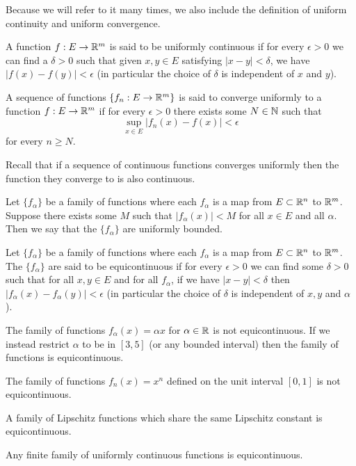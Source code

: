 Because we will refer to it many times, we also include the definition of uniform continuity and uniform convergence.
\begin{definition}
A function $f: E \to \mathbb{R}^m$ is said to be uniformly continuous if for every $\epsilon > 0$ we can find a $\delta > 0$ such that given $x, y \in E$ satisfying $|x - y| < \delta$, we have $|f(x) - f(y)| < \epsilon$ (in particular the choice of $\delta$ is independent of $x$ and $y$).
\end{definition}
\begin{definition}
A sequence of functions $\{f_n: E \to \mathbb{R}^m\}$ is said to converge uniformly to a function $f: E \to \mathbb{R}^m$ if for every $\epsilon > 0$ there exists some $N \in \mathbb{N}$ such that
$$ \sup_{x \in E} |f_n(x) - f(x)| < \epsilon $$
for every $n \geq N$.
\end{definition}
Recall that if a sequence of continuous functions converges uniformly then the function they converge to is also continuous.

\begin{definition}
Let $\{f_\alpha\}$ be a family of functions where each $f_\alpha$ is a map from $E \subset \mathbb{R}^n$ to $\mathbb{R}^m$. Suppose there exists some $M$ such that $|f_\alpha(x)| < M$ for all $x \in E$ and all $\alpha$. Then we say that the $\{f_\alpha\}$ are uniformly bounded.
\end{definition}
\begin{definition}[Equicontinuous]
Let $\{f_\alpha\}$ be a family of functions where each $f_\alpha$ is a map from $E \subset \mathbb{R}^n$ to $\mathbb{R}^m$. The $\{f_\alpha\}$ are said to be equicontinuous if for every $\epsilon > 0$ we can find some $\delta > 0$ such that for all $x, y \in E$ and for all $f_\alpha$, if we have $|x - y| < \delta$ then $|f_\alpha(x) - f_\alpha(y)| < \epsilon$ (in particular the choice of $\delta$ is independent of $x, y$ and $\alpha$).
\end{definition}

\begin{example}
The family of functions $f_{\alpha}(x) = \alpha x$ for $\alpha \in \mathbb{R}$ is not equicontinuous. If we instead restrict $\alpha$ to be in $[3, 5]$ (or any bounded interval) then the family of functions is equicontinuous.
\end{example}
\begin{example}
The family of functions $f_n(x) = x^n$ defined on the unit interval $[0, 1]$ is not equicontinuous.
\end{example}
\begin{example}
A family of Lipschitz functions which share the same Lipschitz constant is equicontinuous.
\end{example}
\begin{example}
Any finite family of uniformly continuous functions is equicontinuous.
\end{example}


